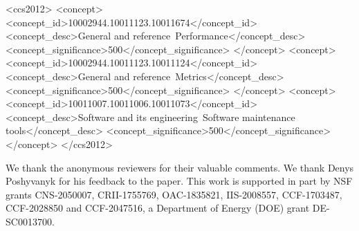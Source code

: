 \documentclass[sigconf,screen]{acmart}
\begin{document}




\begin{CCSXML}
<ccs2012>
<concept>
<concept_id>10002944.10011123.10011674</concept_id>
<concept_desc>General and reference~Performance</concept_desc>
<concept_significance>500</concept_significance>
</concept>
<concept>
<concept_id>10002944.10011123.10011124</concept_id>
<concept_desc>General and reference~Metrics</concept_desc>
<concept_significance>500</concept_significance>
</concept>
<concept>
<concept_id>10011007.10011006.10011073</concept_id>
<concept_desc>Software and its engineering~Software maintenance tools</concept_desc>
<concept_significance>500</concept_significance>
</concept>
</ccs2012>
\end{CCSXML}



\maketitle


% 




%


\begin{acks}
We thank the anonymous reviewers for their valuable comments. We thank Denys Poshyvanyk for his feedback to the paper. This work is supported in part by NSF grants CNS-2050007, CRII-1755769, OAC-1835821, IIS-2008557, CCF-1703487, CCF-2028850 and CCF-2047516, a Department of Energy (DOE) grant DE-SC0013700. %
\end{acks}





\appendix

\end{document}
